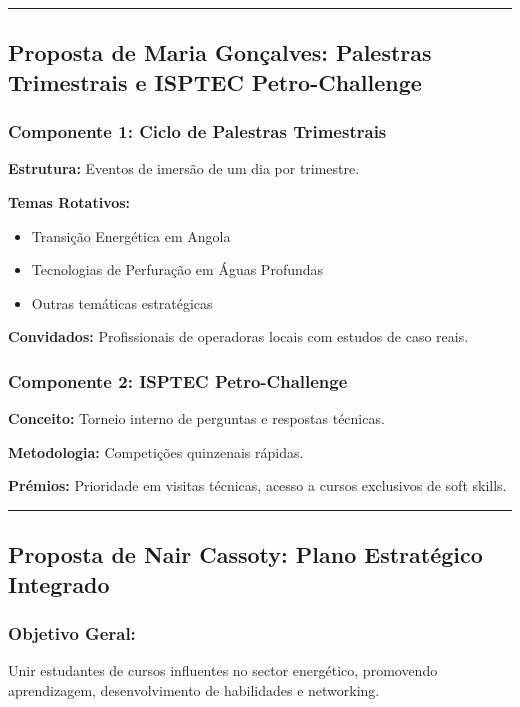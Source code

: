 \documentclass[12pt,a4paper]{article}
\begin{document}
\textcolor{spe-secondary}{\hspace{0.5cm}\rule{0.4\linewidth}{0.8pt}}
\subsection{Proposta de Maria Gonçalves: Palestras Trimestrais e ISPTEC Petro-Challenge}

\subsubsection*{Componente 1: Ciclo de Palestras Trimestrais}

\textbf{Estrutura:} Eventos de imersão de um dia por trimestre.

\textbf{Temas Rotativos:}
\begin{itemize}[itemsep=0.15cm]
    \item Transição Energética em Angola
    \item Tecnologias de Perfuração em Águas Profundas
    \item Outras temáticas estratégicas
\end{itemize}

\textbf{Convidados:} Profissionais de operadoras locais com estudos de caso reais.

\subsubsection*{Componente 2: ISPTEC Petro-Challenge}

\textbf{Conceito:} Torneio interno de perguntas e respostas técnicas.

\textbf{Metodologia:} Competições quinzenais rápidas.

\textbf{Prémios:} Prioridade em visitas técnicas, acesso a cursos exclusivos de soft skills.

\textcolor{spe-secondary}{\hspace{0.5cm}\rule{0.4\linewidth}{0.8pt}}
\subsection{Proposta de Nair Cassoty: Plano Estratégico Integrado}

\subsubsection*{Objetivo Geral:}
Unir estudantes de cursos influentes no sector energético, promovendo aprendizagem, desenvolvimento de habilidades e networking.
\end{document}
